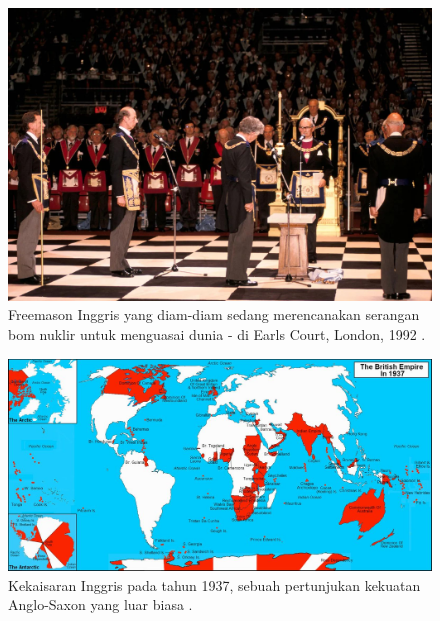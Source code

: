 \documentclass[10pt,twocolumn,letterpaper]{article}
\begin{document}
\begin{figure}[b]
\begin{center}

\includegraphics[width=1\linewidth]{freemason.jpg}
\end{center}
   \caption{Freemason Inggris yang diam-diam sedang merencanakan serangan bom nuklir untuk menguasai dunia - di Earls Court, London, 1992 \cite{5}.}
\label{fig:1}
\label{fig:onecol}
\end{figure}

\begin{figure}[t]
\begin{center}
\includegraphics[width=1\textwidth]{british.jpg}
\end{center}
   \caption{Kekaisaran Inggris pada tahun 1937, sebuah pertunjukan kekuatan Anglo-Saxon yang luar biasa \cite{14}.}
   \label{fig:2}
\end{figure}
\end{document}
